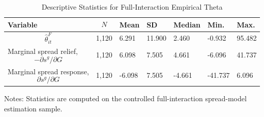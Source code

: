 \begin{table}[H]\centering
\begin{threeparttable}
\caption{Descriptive Statistics for Full-Interaction Empirical Theta}
\label{tab:theta_descriptive_stats}
\scriptsize
\begin{tabularx}{\textwidth}{lYYYYYY}
\toprule
Variable & $$N$$ & Mean & SD & Median & Min. & Max. \\
\midrule
$$\widehat{\theta}^{F}_{it}$$ & 1,120 & 6.291 & 11.900 & 2.460 & -0.932 & 95.482 \\
Marginal spread relief, $$-\partial s^g/\partial G$$ & 1,120 & 6.098 & 7.505 & 4.661 & -6.096 & 41.737 \\
Marginal spread response, $$\partial s^g/\partial G$$ & 1,120 & -6.098 & 7.505 & -4.661 & -41.737 & 6.096 \\
\bottomrule
\end{tabularx}
\begin{tablenotes}[flushleft]\footnotesize
\item Notes: Statistics are computed on the controlled full-interaction spread-model estimation sample.
\end{tablenotes}
\end{threeparttable}
\end{table}
